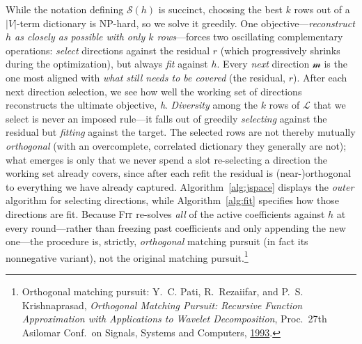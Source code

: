 \documentclass{article}
\newcommand{\jlens}{\mathscr{L}}
\newcommand{\jspace}{\mathscr{S}}
\begin{document}
While the notation defining \(\jspace(h)\) is succinct, choosing the best \(k\) rows out of a \(|V|\)-term dictionary is NP-hard, so we solve it greedily. One objective---\textit{reconstruct \(h\) as closely as possible with only \(k\) rows}---forces two oscillating complementary operations: \textit{select} directions against the residual \(r\) (which progressively shrinks during the optimization), but always \textit{fit} against \(h\). Every \textit{next} direction \(\mathscr{m}\) is the one most aligned with \textit{what still needs to be covered} (the residual, \(r\)). After each next direction selection, we see how well the working set of directions reconstructs the ultimate objective, \textit{h}. \textit{Diversity} among the \(k\) rows of \(\jlens\) that we select is never an imposed rule---it falls out of greedily \textit{selecting} against the residual but \textit{fitting} against the target. The selected rows are not thereby mutually \textit{orthogonal} (with an overcomplete, correlated dictionary they generally are not); what emerges is only that we never spend a slot re-selecting a direction the working set already covers, since after each refit the residual is (near-)orthogonal to everything we have already captured. Algorithm~\ref{alg:jspace} displays the \textit{outer} algorithm for selecting directions, while Algorithm~\ref{alg:fit} specifies how those directions are fit. Because \textsc{Fit} re-solves \textit{all} of the active coefficients against \(h\) at every round---rather than freezing past coefficients and only appending the new one---the procedure is, strictly, \textit{orthogonal} matching pursuit (in fact its nonnegative variant), not the original matching pursuit.\footnote{Orthogonal matching pursuit: Y.~C. Pati, R.~Rezaiifar, and P.~S. Krishnaprasad, \textit{Orthogonal Matching Pursuit: Recursive Function Approximation with Applications to Wavelet Decomposition}, Proc.\ 27th Asilomar Conf.\ on Signals, Systems and Computers, \href{https://doi.org/10.1109/ACSSC.1993.342465}{1993}.}
\end{document}
